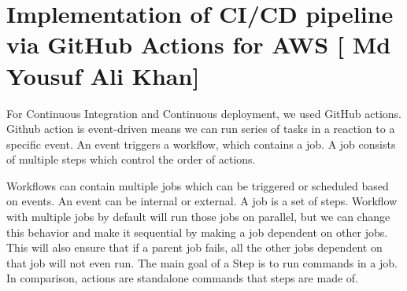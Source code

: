 
\section{Implementation of CI/CD pipeline via GitHub Actions for AWS [ Md Yousuf Ali Khan]}\label{sec:chapter_1}
For Continuous Integration and Continuous deployment, we used GitHub actions. Github action is event-driven means we can run series of tasks in a reaction to a specific event. An event triggers a workflow, which contains a job. A job consists of multiple steps which control the order of actions.

Workflows can contain multiple jobs which can be triggered or scheduled based on events. An event can be internal or external. A job is a set of steps. Workflow with multiple jobs by default will run those jobs on parallel, but we can change this behavior and make it sequential by making a job dependent on other jobs. This will also ensure that if a parent job fails, all the other jobs dependent on that job will not even run. The main goal of a Step is to run commands in a job. In comparison, actions are standalone commands that steps are made of. 

